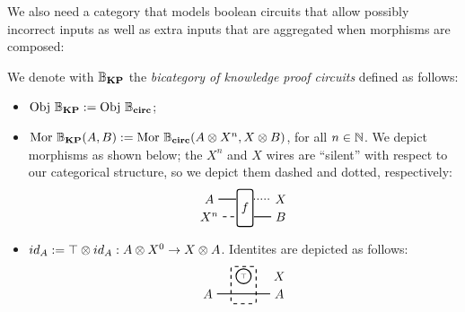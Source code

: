\documentclass[preliminary,copyright,creativecommons,sharealike,noncommercial]{eptcs}
\begin{document}
We also need a category that models boolean circuits that allow possibly
incorrect inputs as well as extra inputs that are aggregated when morphisms are
composed:
%
%
\begin{definition}\label{def: definition of bkp}
  We denote with $\mathbb{B}_\textbf{KP}$ the \emph{bicategory of knowledge proof circuits} defined 
  as follows:
  \begin{itemize}
    \item $\operatorname{Obj} \, \mathbb{B}_\textbf{KP} := \operatorname{Obj} \, \mathbb{B}_\textbf{circ}$;
    \item $\operatorname{Mor} \, \mathbb{B}_\textbf{KP}(A,B) := \operatorname{Mor} \, \mathbb{B}_\textbf{circ}(A \otimes X^n, X \otimes B )$, for all $n \in \mathbb{N}$.
    We depict morphisms as shown below; the $X^n$ and $X$ wires are ``silent'' with respect to 
    our categorical structure, so we depict them dashed and dotted, respectively:
    \begin{equation*}
    \begin{tikzpicture}
      \node[draw, minimum height=30, minimum width=5, rounded corners=2, thick] (f) at (-1,0.5) {$f$};
      \node (A) at (-2,0.75) {$A$};
      \node (Xn0) at (-2,0.25) {$X^{n}$};
      \node (Bf) at (0,0.75) {$X$};
      \node (B) at (0,0.25) {$B$};

      \draw[thick] (A) -- (-1.25,0.75);
      \draw[dashed,thick] (Xn0) -- (-1.25,0.25);

      \draw[dotted,thick] (-0.75,0.75) -- (Bf);
      \draw[thick] (-0.75,0.25) -- (B);
    \end{tikzpicture}  
    \end{equation*}
    \item $id_{A} := \top \otimes id_{A}: A \otimes X^0 \to X \otimes A$. Identites are
    depicted as follows:
    \begin{equation*}
      \begin{tikzpicture}
        \node[draw, dashed, minimum height=30, minimum width=20, rounded corners=2, thick] (f) at (-1,0.5) {};
        \node[thick, draw, circle, radius=2pt, inner sep = 2pt] (true) at (-1,0.75) {\tiny{$\top$}};
        \node (A) at (-2,0.25) {$A$};
        \node (Bf) at (0,0.75) {$X$};
        \node (B) at (0,0.25) {$A$};
  
        \draw[thick] (A) -- (B);
  

\end{tikzpicture}
\end{equation*}
\end{itemize}
\end{definition}
\end{document}
